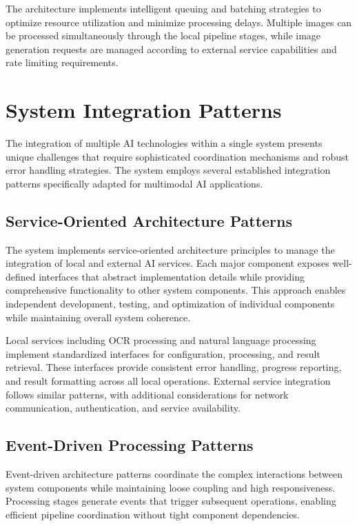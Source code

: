 The architecture implements intelligent queuing and batching strategies to optimize resource utilization and minimize processing delays. Multiple images can be processed simultaneously through the local pipeline stages, while image generation requests are managed according to external service capabilities and rate limiting requirements.

\section{System Integration Patterns}

The integration of multiple AI technologies within a single system presents unique challenges that require sophisticated coordination mechanisms and robust error handling strategies. The system employs several established integration patterns specifically adapted for multimodal AI applications.

\subsection{Service-Oriented Architecture Patterns}

The system implements service-oriented architecture principles to manage the integration of local and external AI services. Each major component exposes well-defined interfaces that abstract implementation details while providing comprehensive functionality to other system components. This approach enables independent development, testing, and optimization of individual components while maintaining overall system coherence.

Local services including OCR processing and natural language processing implement standardized interfaces for configuration, processing, and result retrieval. These interfaces provide consistent error handling, progress reporting, and result formatting across all local operations. External service integration follows similar patterns, with additional considerations for network communication, authentication, and service availability.

\subsection{Event-Driven Processing Patterns}

Event-driven architecture patterns coordinate the complex interactions between system components while maintaining loose coupling and high responsiveness. Processing stages generate events that trigger subsequent operations, enabling efficient pipeline coordination without tight component dependencies.

